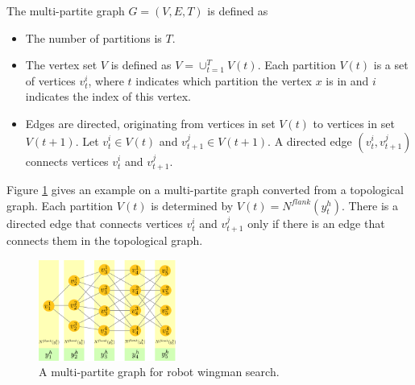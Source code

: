 \documentclass[12pt]{article}
\begin{document}
\begin{mydef}
\label{def:multi_partite}
The multi-partite graph $ G = (V, E, T) $ is defined as
\begin{itemize}
\item The number of partitions is $ T $.
\item The vertex set $ V $ is defined as $ V = \cup_{t=1}^{T} V(t) $.
Each partition $ V(t) $ is a set of vertices $ v^{i}_{t} $, where $ t $ indicates which partition the vertex $ x $ is in and $ i $ indicates the index of this vertex.
\item Edges are directed, originating from vertices in set $ V(t) $ to vertices in set $ V(t+1) $.
Let $ v^{i}_{t} \in V(t) $ and $ v^{j}_{t+1} \in V(t+1) $.
A directed edge $ (v^{i}_{t}, v^{j}_{t+1}) $ connects vertices $ v^{i}_{t} $ and $ v^{j}_{t+1} $. 
\end{itemize}
\end{mydef}

Figure \ref{fig:MultiPartite} gives an example on a multi-partite graph converted from a topological graph.
Each partition $ V(t) $ is determined by $ V(t) = N^{flank} ( y^{h}_{t} ) $.
There is a directed edge that connects vertices $ v^{i}_{t} $ and $ v^{j}_{t+1} $ only if there is an edge that connects them in the topological graph.

\begin{figure}[htbp]
\centering
\includegraphics[width=0.4\textwidth]{./images/MultiPartite.pdf}
\caption{A multi-partite graph for robot wingman search.}
\label{fig:MultiPartite}
\end{figure}
 
\end{document}
